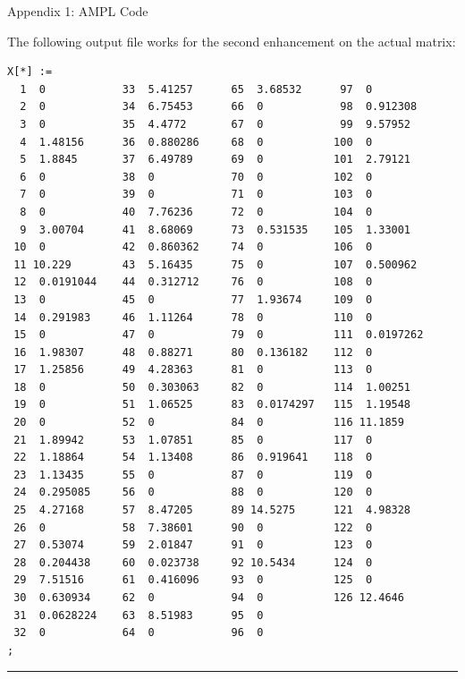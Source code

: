 \documentclass[12pt]{article}
\makeatletter
\newenvironment{task}{\@startsection
       {section}{1}
       {0.4em}{-.5ex plus -1ex minus -.2ex}{.5ex plus .2ex}
       {\pagebreak[3]\large\bf\noindent{Task}}}
       {\nopagebreak[3]\vspace{3ex}\begin{center}\rule{1\linewidth}{.3pt}\end{center}}
\makeatother
\begin{document}
\begin{task}{Appendix 1: AMPL Code}
\begin{enumerate}
The following output file works for the second enhancement on the actual matrix:
\begin{lstlisting}
X[*] :=
  1  0            33  5.41257      65  3.68532      97  0
  2  0            34  6.75453      66  0            98  0.912308
  3  0            35  4.4772       67  0            99  9.57952
  4  1.48156      36  0.880286     68  0           100  0
  5  1.8845       37  6.49789      69  0           101  2.79121
  6  0            38  0            70  0           102  0
  7  0            39  0            71  0           103  0
  8  0            40  7.76236      72  0           104  0
  9  3.00704      41  8.68069      73  0.531535    105  1.33001
 10  0            42  0.860362     74  0           106  0
 11 10.229        43  5.16435      75  0           107  0.500962
 12  0.0191044    44  0.312712     76  0           108  0
 13  0            45  0            77  1.93674     109  0
 14  0.291983     46  1.11264      78  0           110  0
 15  0            47  0            79  0           111  0.0197262
 16  1.98307      48  0.88271      80  0.136182    112  0
 17  1.25856      49  4.28363      81  0           113  0
 18  0            50  0.303063     82  0           114  1.00251
 19  0            51  1.06525      83  0.0174297   115  1.19548
 20  0            52  0            84  0           116 11.1859
 21  1.89942      53  1.07851      85  0           117  0
 22  1.18864      54  1.13408      86  0.919641    118  0
 23  1.13435      55  0            87  0           119  0
 24  0.295085     56  0            88  0           120  0
 25  4.27168      57  8.47205      89 14.5275      121  4.98328
 26  0            58  7.38601      90  0           122  0
 27  0.53074      59  2.01847      91  0           123  0
 28  0.204438     60  0.023738     92 10.5434      124  0
 29  7.51516      61  0.416096     93  0           125  0
 30  0.630934     62  0            94  0           126 12.4646
 31  0.0628224    63  8.51983      95  0
 32  0            64  0            96  0
;
\end{lstlisting}

\end{enumerate}
\end{task}
\end{document}
